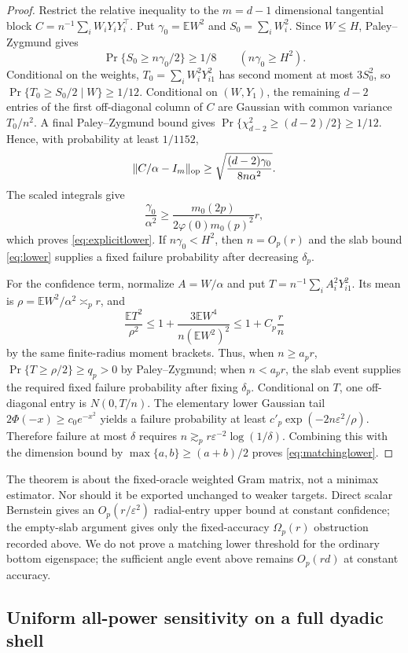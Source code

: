 \documentclass[11pt]{article}
\newcommand{\E}{\mathbb E}
\begin{document}
\begin{proof}
Restrict the relative inequality to the $m=d-1$ dimensional tangential block
$C=n^{-1}\sum_iW_iY_iY_i^\top$.  Put $\gamma_0=\E W^2$ and $S_0=\sum_iW_i^2$.  Since $W\le H$,
Paley--Zygmund gives
\[
 \Pr\{S_0\ge n\gamma_0/2\}\ge1/8\qquad(n\gamma_0\ge H^2).
\]
Conditional on the weights, $T_0=\sum_iW_i^2Y_{i1}^2$ has second moment at most $3S_0^2$, so
$\Pr\{T_0\ge S_0/2\mid W\}\ge1/12$.  Conditional on $(W,Y_1)$, the remaining $d-2$ entries of the first
off-diagonal column of $C$ are Gaussian with common variance $T_0/n^2$.  A final Paley--Zygmund bound gives
$\Pr\{\chi^2_{d-2}\ge(d-2)/2\}\ge1/12$.  Hence, with probability at least $1/1152$,
\[
 \lVert C/\alpha-I_m\rVert_{\rm op}
 \ge\sqrt{\frac{(d-2)\gamma_0}{8n\alpha^2}}.
\]
The scaled integrals give
\[
 \frac{\gamma_0}{\alpha^2}\ge
 \frac{m_0(2p)}{2\varphi(0)m_0(p)^2}r,
\]
which proves \eqref{eq:explicitlower}.  If $n\gamma_0<H^2$, then $n=O_p(r)$ and the slab bound
\eqref{eq:lower} supplies a fixed failure probability after decreasing $\delta_p$.

For the confidence term, normalize $A=W/\alpha$ and put
$T=n^{-1}\sum_iA_i^2Y_{i1}^2$.  Its mean is
$\rho=\E W^2/\alpha^2\asymp_pr$, and
\[
 \frac{\E T^2}{\rho^2}
 \le1+\frac{3\E W^4}{n(\E W^2)^2}
 \le1+C_p\frac rn
\]
by the same finite-radius moment brackets.  Thus, when $n\ge a_pr$,
$\Pr\{T\ge\rho/2\}\ge q_p>0$ by Paley--Zygmund; when $n<a_pr$, the slab event supplies the required fixed
failure probability after fixing $\delta_p$.  Conditional on $T$, one off-diagonal entry is
$N(0,T/n)$.  The elementary lower Gaussian tail
$2\Phi(-x)\ge c_0e^{-x^2}$ yields a failure probability at least
$c'_p\exp(-2n\varepsilon^2/\rho)$.  Therefore failure at most $\delta$ requires
$n\gtrsim_pr\varepsilon^{-2}\log(1/\delta)$.  Combining this with the dimension bound by
$\max\{a,b\}\ge(a+b)/2$ proves \eqref{eq:matchinglower}.
\end{proof}

The theorem is about the fixed-oracle weighted Gram matrix, not a minimax estimator.  Nor should it be exported
unchanged to weaker targets.  Direct scalar Bernstein gives an $O_p(r/\varepsilon^2)$ radial-entry upper bound at
constant confidence; the empty-slab argument gives only the fixed-accuracy $\Omega_p(r)$ obstruction recorded
above.  We do not prove a matching lower threshold for the ordinary bottom eigenspace; the sufficient angle event
above remains $O_p(rd)$ at constant accuracy.

\subsection{Uniform all-power sensitivity on a full dyadic shell}
\end{document}
